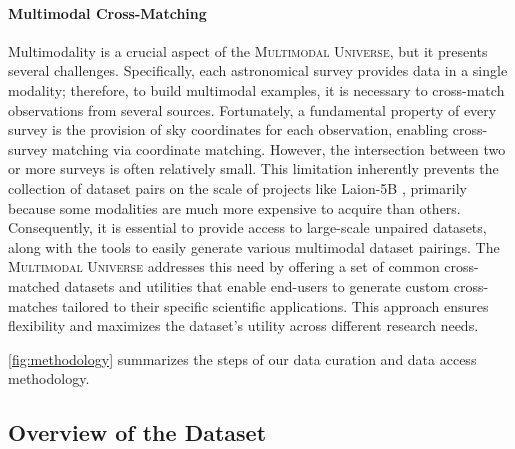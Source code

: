 \documentclass[dvipsnames,table]{article}
\newcommand\pile{\textsc{Multimodal Universe}\xspace}
\begin{document}
\paragraph{Multimodal Cross-Matching}
Multimodality is a crucial aspect of the \pile, but it presents several challenges. Specifically, each astronomical survey provides data in a single modality; therefore, to build multimodal examples, it is necessary to cross-match observations from several sources. Fortunately, a fundamental property of every survey is the provision of sky coordinates for each observation, enabling cross-survey matching via coordinate matching. However, the intersection between two or more surveys is often relatively small. This limitation inherently prevents the collection of dataset pairs on the scale of projects like Laion-5B \cite{Schuhmann2022}, primarily because some modalities are much more expensive to acquire than others. Consequently, it is essential to provide access to large-scale unpaired datasets, along with the tools to easily generate various multimodal dataset pairings. The \pile addresses this need by offering a set of common cross-matched datasets and utilities that enable end-users to generate custom cross-matches tailored to their specific scientific applications. This approach ensures flexibility and maximizes the dataset's utility across different research needs.

\autoref{fig:methodology} summarizes the steps of our data curation and data access methodology.

\subsection{Overview of the Dataset}
\end{document}
